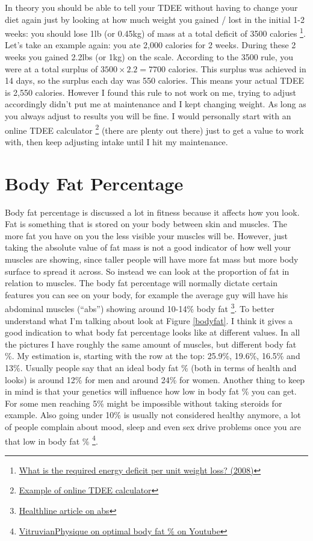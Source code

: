 \documentclass[openany, 12pt]{book}
\begin{document}
	In theory you should be able to tell your TDEE without having
	to change your diet again just by looking at how much weight you gained / lost in the initial 1-2 weeks: you should lose 1lb (or 0.45kg) of mass at 
	a total deficit of 3500 calories
        \footnote{\href{https://www.ncbi.nlm.nih.gov/pmc/articles/PMC2376744/}{What is the required energy deficit per 
	unit weight loss? (2008)}}. Let's take an example again: you ate 2,000 calories for 2 weeks. During these 2 weeks you gained 2.2lbs (or 1kg) on the
	scale. According to the 3500 rule, you were at a total surplus of $3500 \times 2.2 = 7700$ calories. This surplus was achieved in 14 days, so the
	surplus each day was 550 calories. This means your actual TDEE is 2,550 calories. However I found this rule to not work on me, trying to adjust 
	accordingly didn't put me at maintenance and I kept changing weight. As long as you always adjust to results you will be fine. I would personally
	start with an online TDEE calculator
        \footnote{\href{https://tdeecalculator.net/}{Example of online TDEE calculator}} (there are plenty out there) 
	just to get a value to work with, then keep adjusting intake until I hit my maintenance.
	
	\section{Body Fat Percentage}
	
	Body fat percentage is discussed a lot in fitness because it affects how you look. Fat is something that is stored on your body between skin and muscles.
        The more fat you have on you the less visible your muscles will be. However, just taking the absolute value of fat mass is not a good indicator of how well
        your muscles are showing, since taller people will have more fat mass but more body surface to spread it across. So instead we can look at the proportion of
        fat in relation to muscles. The body fat percentage will normally dictate certain features you can see on your body, for example the average guy will have his
        abdominal muscles (``abs'') showing around 10-14\% body fat
        \footnote{\href{https://www.healthline.com/health/body-fat-percentage-for-abs}{Healthline article on abs}}.
        To better understand what I'm talking about look at Figure \ref{bodyfat}. I think it gives a good indication to what body fat percentage looks like at different values.
        In all the pictures I have roughly the same amount of muscles, but different body fat \%. My estimation is, starting with the row at the top: 25.9\%, 19.6\%, 16.5\% and 13\%.
        Usually people say that an ideal body fat \% (both in terms of health and looks) is around 12\% for men
        and around 24\% for women. Another thing to keep in mind is that your genetics will influence how low in body fat \% you can get. For some men reaching 5\% might be
        impossible without taking steroids for example. Also going under 10\% is usually not considered healthy anymore, a lot of people complain about mood, sleep and even sex
        drive problems once you are that low in body fat \%
        \footnote{\href{https://www.youtube.com/watch?v=IHvmtvzOfDg}{VitruvianPhysique on optimal body fat \% on Youtube}}. 
        
\end{document}
